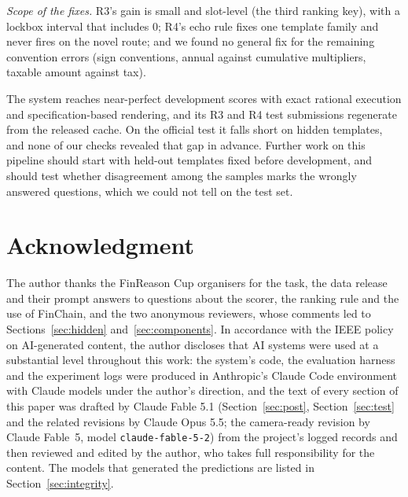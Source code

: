 \documentclass[conference]{IEEEtran}
\newcommand{\id}[1]{\texttt{#1}}
\begin{document}
\emph{Scope of the fixes.} R3's gain is small and slot-level (the third ranking key), with a lockbox interval that includes 0; R4's echo rule fixes one template family and never fires on the novel route; and we found no general fix for the remaining convention errors (sign conventions, annual against cumulative multipliers, taxable amount against tax).

The system reaches near-perfect development scores with exact rational execution and specification-based rendering, and its R3 and R4 test submissions regenerate from the released cache. On the official test it falls short on hidden templates, and none of our checks revealed that gap in advance. Further work on this pipeline should start with held-out templates fixed before development, and should test whether disagreement among the samples marks the wrongly answered questions, which we could not tell on the test set.

\section*{Acknowledgment}
The author thanks the FinReason Cup organisers for the task, the data release and their prompt answers to questions about the scorer, the ranking rule and the use of FinChain, and the two anonymous reviewers, whose comments led to Sections~\ref{sec:hidden} and~\ref{sec:components}. In accordance with the IEEE policy on AI-generated content, the author discloses that AI systems were used at a substantial level throughout this work: the system's code, the evaluation harness and the experiment logs were produced in Anthropic's Claude Code environment with Claude models under the author's direction, and the text of every section of this paper was drafted by Claude Fable 5.1 (Section~\ref{sec:post}, Section~\ref{sec:test} and the related revisions by Claude Opus 5.5; the camera-ready revision by Claude Fable~5, model \id{claude-fable-5-2}) from the project's logged records and then reviewed and edited by the author, who takes full responsibility for the content. The models that generated the predictions are listed in Section~\ref{sec:integrity}.



\end{document}
